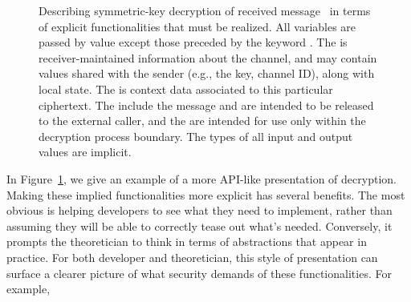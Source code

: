 \begin{figure}[t]
  \begin{center}
  \end{center}
%
\caption{Describing symmetric-key decryption of received message~ in terms of
  explicit functionalities that must be realized. All variables are passed by
  value except those preceded by the keyword . The
   is receiver-maintained information about the channel,
  and may contain values shared with the sender (e.g., the key, channel ID),
  along with local state.  The  is context data associated
  to this particular ciphertext. The  include the message
  and are intended to be released to the external caller, and the
   are intended for use only within the decryption process
  boundary.  The types of all input and output values are implicit.}
\label{fig:syntax-api-example}
\end{figure}
%
In Figure~\ref{fig:syntax-api-example}, we give an example of a more
API-like presentation of decryption.
%
Making these implied functionalities more explicit has several benefits.  The
most obvious is helping developers to see what they need to implement, rather
than assuming they will be able to correctly tease out what's needed.
Conversely, it prompts the theoretician to think in terms of abstractions that
appear in practice.
%
For both developer and theoretician, this style of presentation can surface a
clearer picture of what security demands of these functionalities. For example,
